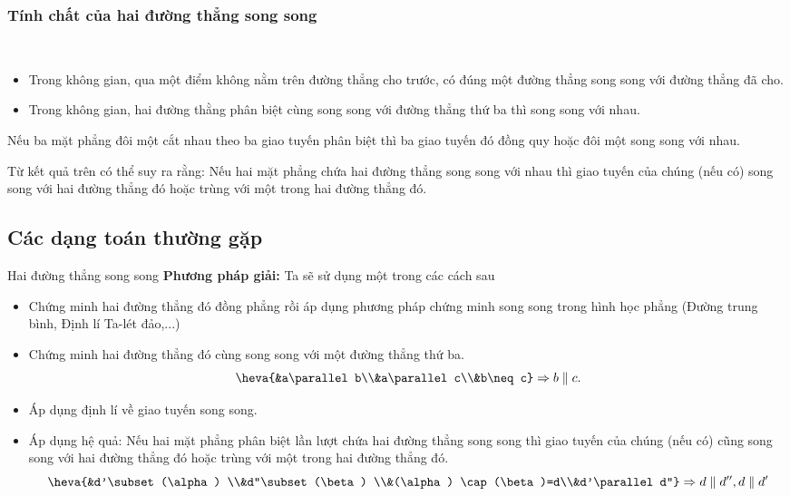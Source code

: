 \subsubsection{Tính chất của hai đường thẳng song song}
\begin{tc}~
\begin{itemize}
\item Trong không gian, qua một điểm không nằm trên đường thẳng cho trước, có đúng một đường thẳng song song với đường thẳng đã cho.
\item Trong không gian, hai đường thằng phân biệt cùng song song với đường thẳng thứ ba thì song song với nhau.
\end{itemize}
\end{tc}
\begin{dl}
Nếu ba mặt phẳng đôi một cắt nhau theo ba giao tuyến phân biệt thì ba giao tuyến đó đồng quy hoặc đôi một song song với nhau.
\end{dl}
\begin{note}
	Từ kết quả trên có thể suy ra rằng: Nếu hai mặt phẳng chứa hai đường thẳng song song với nhau thì giao tuyến của chúng (nếu có) song song với hai đường thẳng đó hoặc trùng với một trong hai đường thẳng đó.
\end{note}
\subsection{Các dạng toán thường gặp}
\begin{dang}{Hai đường thẳng song song}
	\textbf{Phương pháp giải:} Ta sẽ sử dụng một trong các cách sau
\begin{itemize}
\item Chứng minh hai đường thẳng đó đồng phẳng rồi áp dụng phương pháp chứng minh song song trong hình học phẳng (Đường trung bình, Định lí Ta-lét đảo,...)
\item Chứng minh hai đường thẳng đó cùng song song với một đường thẳng thứ ba.
\[\heva{&a\parallel b\\&a\parallel c\\&b\neq c}\Rightarrow b\parallel c.\]
\item Áp dụng định lí về giao tuyến song song.
\item Áp dụng hệ quả: Nếu hai mặt phẳng phân biệt lần lượt chứa hai đường thẳng song song thì giao tuyến của chúng (nếu có) cũng song song với hai đường thẳng đó hoặc trùng với một trong hai đường thẳng đó.
\[\heva{&d'\subset(\alpha) \\&d''\subset(\beta) \\&(\alpha) \cap(\beta)=d\\&d'\parallel d''} \Rightarrow d\parallel d'',d\parallel d'
\]
\end{itemize}
\end{dang}
